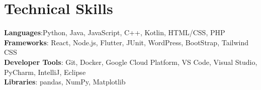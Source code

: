 \documentclass[letterpaper,11pt]{article}
\begin{document}
\section{Technical Skills}
 \begin{itemize}[leftmargin=0.15in, label={}]
    \small{\item{
     \textbf{Languages}{:Python, Java, JavaScript, C++, Kotlin,  HTML/CSS, PHP} \\
     \textbf{Frameworks}{: React, Node.js, Flutter, JUnit, WordPress, BootStrap, Tailwind CSS} \\
     \textbf{Developer Tools}{: Git, Docker, Google Cloud Platform, VS Code, Visual Studio, PyCharm, IntelliJ, Eclipse} \\
     \textbf{Libraries}{: pandas, NumPy, Matplotlib}
    }}
 \end{itemize}



  
  
\end{document}
